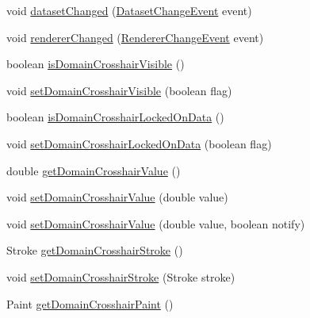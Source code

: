 \begin{DoxyCompactItemize}
\item 
void \mbox{\hyperlink{classorg_1_1jfree_1_1chart_1_1plot_1_1_x_y_plot_a87830fd0f3fe900f044bb6e4e47bcb63}{dataset\+Changed}} (\mbox{\hyperlink{classorg_1_1jfree_1_1data_1_1general_1_1_dataset_change_event}{Dataset\+Change\+Event}} event)
\item 
void \mbox{\hyperlink{classorg_1_1jfree_1_1chart_1_1plot_1_1_x_y_plot_ae220bdb4eb1ed66849c25b19b2e011bb}{renderer\+Changed}} (\mbox{\hyperlink{classorg_1_1jfree_1_1chart_1_1event_1_1_renderer_change_event}{Renderer\+Change\+Event}} event)
\item 
boolean \mbox{\hyperlink{classorg_1_1jfree_1_1chart_1_1plot_1_1_x_y_plot_ae1fc992f5b9f115943993c300b669c8d}{is\+Domain\+Crosshair\+Visible}} ()
\item 
void \mbox{\hyperlink{classorg_1_1jfree_1_1chart_1_1plot_1_1_x_y_plot_afccb957d4967c1b414c051328124efcb}{set\+Domain\+Crosshair\+Visible}} (boolean flag)
\item 
boolean \mbox{\hyperlink{classorg_1_1jfree_1_1chart_1_1plot_1_1_x_y_plot_adaa769a4f03f93f815c6f0be6f9d9435}{is\+Domain\+Crosshair\+Locked\+On\+Data}} ()
\item 
void \mbox{\hyperlink{classorg_1_1jfree_1_1chart_1_1plot_1_1_x_y_plot_a969571f89d0c1776fdb612c0f3fc4e97}{set\+Domain\+Crosshair\+Locked\+On\+Data}} (boolean flag)
\item 
double \mbox{\hyperlink{classorg_1_1jfree_1_1chart_1_1plot_1_1_x_y_plot_af89d596c34f4964a58156a7e83728536}{get\+Domain\+Crosshair\+Value}} ()
\item 
void \mbox{\hyperlink{classorg_1_1jfree_1_1chart_1_1plot_1_1_x_y_plot_a00691ca44150f95ff515fb987e734585}{set\+Domain\+Crosshair\+Value}} (double value)
\item 
void \mbox{\hyperlink{classorg_1_1jfree_1_1chart_1_1plot_1_1_x_y_plot_a474a9b26745c993fd9b3929a42a0277c}{set\+Domain\+Crosshair\+Value}} (double value, boolean notify)
\item 
Stroke \mbox{\hyperlink{classorg_1_1jfree_1_1chart_1_1plot_1_1_x_y_plot_a764aae9df73c20a28fc79cede021d9e2}{get\+Domain\+Crosshair\+Stroke}} ()
\item 
void \mbox{\hyperlink{classorg_1_1jfree_1_1chart_1_1plot_1_1_x_y_plot_a6807ab7e31a792322c7fc3a3d387df77}{set\+Domain\+Crosshair\+Stroke}} (Stroke stroke)
\item 
Paint \mbox{\hyperlink{classorg_1_1jfree_1_1chart_1_1plot_1_1_x_y_plot_a43a34d17324643826f1b1587e73fb38a}{get\+Domain\+Crosshair\+Paint}} ()
\item 

\end{DoxyCompactItemize}
